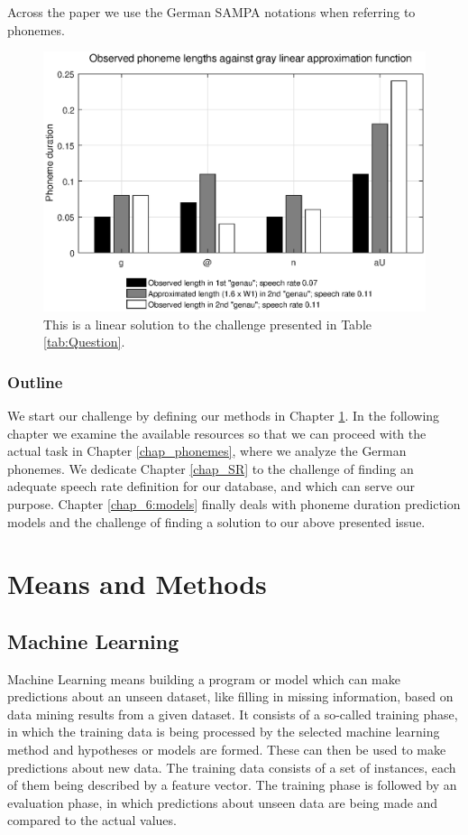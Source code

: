 \documentclass[11pt,a4paper]{scrbook}
\begin{document}
Across the paper we use the German SAMPA notations when referring to phonemes.
\begin{figure}[htbp]
	\centering
	\includegraphics[trim=23mm 23mm 0mm 0mm, scale=0.7]{../Graphen/Linear_approx.eps}
	\vspace{4mm}
	\caption[Linear phoneme duration approximation]{This is a linear solution to the challenge presented in Table \ref{tab:Question}.}
	\label{fig:linear_approx}	
\end{figure}

\subsection*{Outline}
We start our challenge by defining our methods in Chapter \ref{chap_2}. In the following chapter we examine the available resources so that we can proceed with the actual task in Chapter \ref{chap_phonemes}, where we analyze the German phonemes. We dedicate Chapter \ref{chap_SR} to the challenge of finding an adequate speech rate definition for our database, and which can serve our purpose. Chapter \ref{chap_6:models} finally deals with phoneme duration prediction models and the challenge of finding a solution to our above presented issue.

\chapter{Means and Methods}
\label{chap_2}

\section{Machine Learning}
Machine Learning means building a program or model which can make predictions about an unseen dataset, like filling in missing information, based on data mining results from a given dataset. It consists of a so-called training phase, in which the training data is being processed by the selected machine learning method and hypotheses or models are formed. These can then be used to make predictions about new data. The training data consists of a set of instances, each of them being described by a feature vector. The training phase is followed by an evaluation phase, in which predictions about unseen data are being made and compared to the actual values. 
\end{document}
